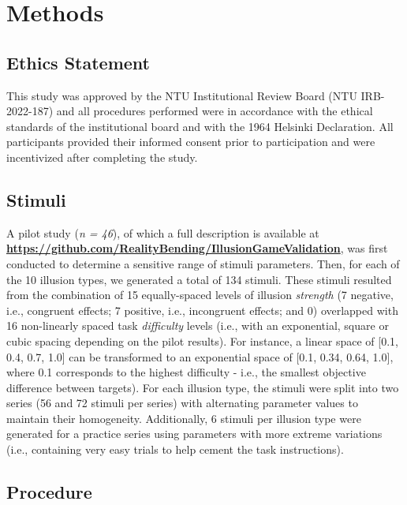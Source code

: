 \documentclass[
  man,floatsintext]{apa6}
\begin{document}
\hypertarget{methods}{%
\section{Methods}\label{methods}}

\hypertarget{ethics-statement}{%
\subsection{Ethics Statement}\label{ethics-statement}}

This study was approved by the NTU Institutional Review Board (NTU IRB-2022-187) and all procedures performed were in accordance with the ethical standards of the institutional board and with the 1964 Helsinki Declaration. All participants provided their informed consent prior to participation and were incentivized after completing the study.

\hypertarget{stimuli}{%
\subsection{Stimuli}\label{stimuli}}

A pilot study (\emph{n = 46}), of which a full description is available at \href{https://github.com/RealityBending/IllusionGameValidation}{\textbf{https://github.com/RealityBending/IllusionGameValidation}}, was first conducted to determine a sensitive range of stimuli parameters. Then, for each of the 10 illusion types, we generated a total of 134 stimuli. These stimuli resulted from the combination of 15 equally-spaced levels of illusion \emph{strength} (7 negative, i.e., congruent effects; 7 positive, i.e., incongruent effects; and 0) overlapped with 16 non-linearly spaced task \emph{difficulty} levels (i.e., with an exponential, square or cubic spacing depending on the pilot results). For instance, a linear space of {[}0.1, 0.4, 0.7, 1.0{]} can be transformed to an exponential space of {[}0.1, 0.34, 0.64, 1.0{]}, where 0.1 corresponds to the highest difficulty - i.e., the smallest objective difference between targets). For each illusion type, the stimuli were split into two series (56 and 72 stimuli per series) with alternating parameter values to maintain their homogeneity. Additionally, 6 stimuli per illusion type were generated for a practice series using parameters with more extreme variations (i.e., containing very easy trials to help cement the task instructions).

\hypertarget{procedure}{%
\subsection{Procedure}\label{procedure}}
\end{document}
